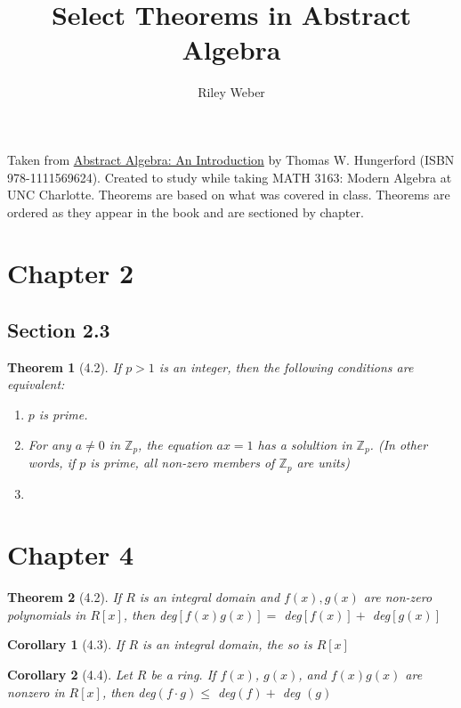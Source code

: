 \documentclass{article}
\theoremstyle{break}
\newtheorem*{theorem*}{Theorem}
\newtheorem*{corollary*}{Corollary}
\newcommand*{\Z}{\mathbb{Z}}
\begin{document}
\title{Select Theorems in Abstract Algebra}
\author{Riley Weber}
\maketitle

Taken from \underline{Abstract Algebra: An Introduction} by Thomas W.
Hungerford (ISBN 978-1111569624). Created to study while taking MATH 3163:
Modern Algebra at UNC Charlotte. Theorems are based on what was covered in
class. Theorems are ordered as they appear in the book and are sectioned by
chapter.

\section*{Chapter 2}
\subsection*{Section 2.3}

\begin{theorem*}[4.2]
  If $p > 1$ is an integer, then the following conditions are equivalent:
  \begin{enumerate}
    \item $p$ is prime.
    \item For any $a \neq 0$ in $\Z_p$, the equation $ax = 1$ has a solultion
    in $\Z_p$. (In other words, if $p$ is prime, all non-zero members of $\Z_p$
    are units)
    \item
  \end{enumerate}
\end{theorem*}

\section*{Chapter 4}
\begin{theorem*}[4.2]
  If $R$ is an integral domain and $f(x), g(x)$ are non-zero polynomials in
  $R[x]$, then deg$[f(x)g(x)] = $ deg$[f(x)] +$ deg$[g(x)]$
\end{theorem*}

\begin{corollary*}[4.3]
  If $R$ is an integral domain, the so is $R[x]$
\end{corollary*}

\begin{corollary*}[4.4]
  Let $R$ be a ring. If $f(x)$, $g(x)$, and $f(x)g(x)$ are nonzero in $R[x]$,
  then deg$(f \cdot g) \leq $ deg$(f) + $ deg $(g)$
\end{corollary*}
\end{document}
